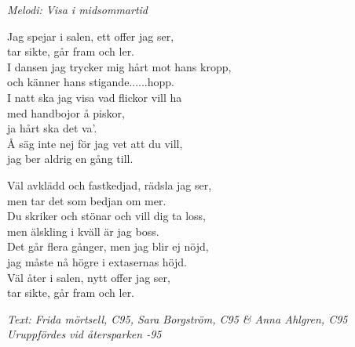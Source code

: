 {\footnotesize\textit{Melodi: Visa i midsommartid}}\par
\vspace{10pt}
Jag spejar i salen, ett offer jag ser,\\
tar sikte, går fram och ler.\\
I dansen jag trycker mig hårt mot hans kropp,\\
och känner hans stigande......hopp.\\
I natt ska jag visa vad flickor vill ha\\
med handbojor å piskor,\\
ja hårt ska det va'.\\
Å säg inte nej för jag vet att du vill,\\
jag ber aldrig en gång till.\par
\vspace{10pt}
Väl avklädd och fastkedjad, rädsla jag ser,\\
men tar det som bedjan om mer.\\
Du skriker och stönar och vill dig ta loss,\\
men älskling i kväll är jag boss.\\
Det går flera gånger, men jag blir ej nöjd,\\
jag måste nå högre i extasernas höjd.\\
Väl åter i salen, nytt offer jag ser,\\
tar sikte, går fram och ler.
\par
\vspace{10pt}
{\footnotesize\textit{Text: Frida mörtsell, C95, Sara Borgström, C95 \& Anna Ahlgren, C95 \\
					 Uruppfördes vid återsparken -95}}
